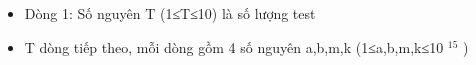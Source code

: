 \begin{itemize}
	\item     Dòng 1: Số nguyên T (1≤T≤10) là số lượng test   
	\item     T dòng tiếp theo, mỗi dòng gồm 4 số nguyên a,b,m,k (1≤a,b,m,k≤10    $^     15    $    )   
\end{itemize}

\